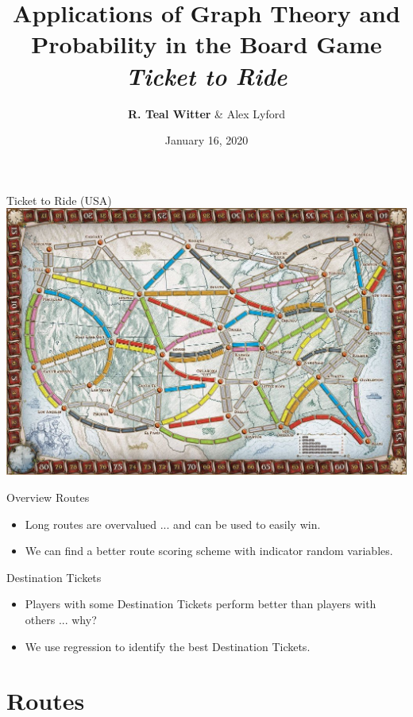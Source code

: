 \documentclass[12pt]{beamer}
\title{Applications of Graph Theory and Probability
in the Board Game \textit{Ticket to Ride}}
\author{\textbf{R. {\color{teal} Teal} Witter} \& Alex Lyford}
\institute{Middlebury College}
\date{January 16, 2020}
\begin{document}
\frame{\titlepage}

\begin{frame}{Ticket to Ride (USA)}
    \centering
    \includegraphics[scale=.3]{figures/board}
\end{frame}

\begin{frame}{Overview}
    Routes
    \begin{itemize}
        \item Long routes are overvalued ... and can 
        be used to easily win.
        \item We can find a better route scoring scheme 
        with indicator random variables.
    \end{itemize}
    
    Destination Tickets
    \begin{itemize}
        \item Players with some Destination Tickets perform
        better than players with others ... why?
        \item We use regression to identify
        the best Destination Tickets.
    \end{itemize}
    
\end{frame}

\section{Routes}
\end{document}
